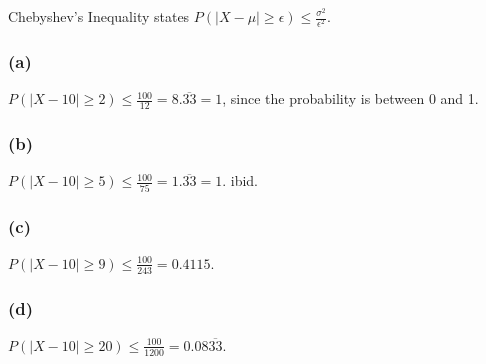 \documentclass[]{article}
\begin{document}
Chebyshev's Inequality states
\(P(|X - \mu| \geq \epsilon) \leq \frac{\sigma^2}{\epsilon^2}\).

\subsubsection{(a)}\label{a}

\(P(|X - 10| \geq 2) \leq \frac{100}{12} = 8.\overline{33} = 1\), since
the probability is between 0 and 1.

\subsubsection{(b)}\label{b}

\(P(|X - 10| \geq 5) \leq \frac{100}{75} = 1.\overline{33} = 1\). ibid.

\subsubsection{(c)}\label{c}

\(P(|X - 10| \geq 9) \leq \frac{100}{243} = 0.4115\).

\subsubsection{(d)}\label{d}

\(P(|X - 10| \geq 20) \leq \frac{100}{1200} = 0.08\overline{33}\).
\end{document}
